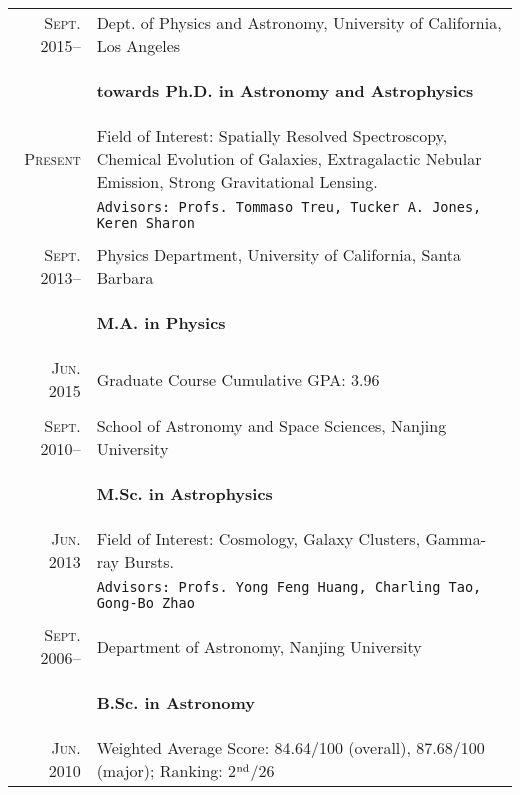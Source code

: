 \documentclass[letterpaper,12pt]{article}
\newcommand{\narrow}{-1.6ex}
\newcommand{\xnarrow}{-2.8ex}
\begin{document}
\begin{tabular}{r|p{5.25in}}
  \textsc{Sept. 2015}--     &   Dept. of Physics and Astronomy, University of California, Los Angeles \\[\narrow]
                            &   \begin{flushright}
                                    \textbf{towards Ph.D. in Astronomy and Astrophysics}
                                \end{flushright}    \\[\xnarrow]
  \textsc{Present}          &   Field of Interest: Spatially Resolved Spectroscopy, Chemical Evolution of Galaxies, Extragalactic Nebular Emission, Strong Gravitational Lensing. \\
                            &   \texttt{Advisors: Profs. Tommaso Treu, Tucker A. Jones, Keren Sharon}     \\
  \multicolumn{2}{c}{} \\[\narrow]
  \textsc{Sept. 2013}--     &   Physics Department, University of California, Santa Barbara     \\[\narrow]
                            &   \begin{flushright}
                                    \textbf{M.A. in Physics}
                                \end{flushright}    \\[\xnarrow]
  \textsc{Jun. 2015}        &   Graduate Course Cumulative GPA: 3.96     \\
  \multicolumn{2}{c}{} \\[\narrow]
  \textsc{Sept. 2010}--     &   School of Astronomy and Space Sciences, Nanjing University      \\[\narrow]
                            &   \begin{flushright}
                                    \textbf{M.Sc. in Astrophysics}
                                \end{flushright}    \\[\xnarrow]
  \textsc{Jun. 2013}        &   Field of Interest: Cosmology, Galaxy Clusters, Gamma-ray Bursts. \\
                            &   \texttt{Advisors: Profs. Yong Feng Huang, Charling Tao, Gong-Bo Zhao}   \\
  \multicolumn{2}{c}{} \\[\narrow]
  \textsc{Sept. 2006}--     &   Department of Astronomy, Nanjing University \\[\narrow]
                            &   \begin{flushright}
                                    \textbf{B.Sc. in Astronomy}
                                \end{flushright}    \\[\xnarrow]
  \textsc{Jun. 2010}        &   Weighted Average Score: 84.64/100 (overall), 87.68/100 (major); Ranking: 2$^{\rm nd}$/26
\end{tabular}
\end{document}
